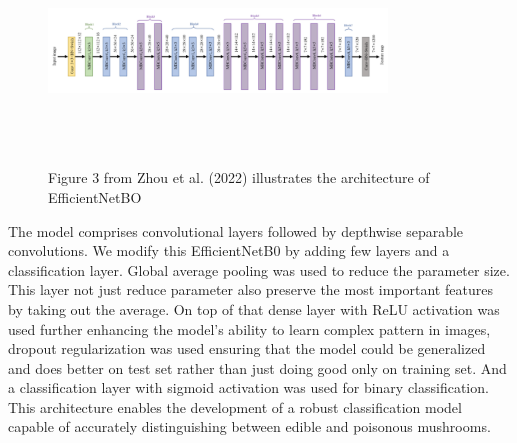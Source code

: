 \begin{figure}[!ht]
    \centering
    \includegraphics[height=6cm, width=9cm]{images/efflayer.PNG}
    \caption{Figure 3 from Zhou et al. (2022) illustrates the architecture of EfficientNetBO}
\end{figure}

The model comprises convolutional layers followed by depthwise separable convolutions. We modify this EfficientNetB0 by adding few layers and a classification layer. Global average pooling was used to reduce the parameter size. This layer not just reduce parameter also preserve the most important features by taking out the average. On top of that dense layer with ReLU activation was used further enhancing the model's ability to learn complex pattern in images, dropout regularization was used ensuring that the model could be generalized and does better on test set rather than just doing good only on training set. And a classification layer with sigmoid activation was used for binary classification. This architecture enables the development of a robust classification model capable of accurately distinguishing between edible and poisonous mushrooms.